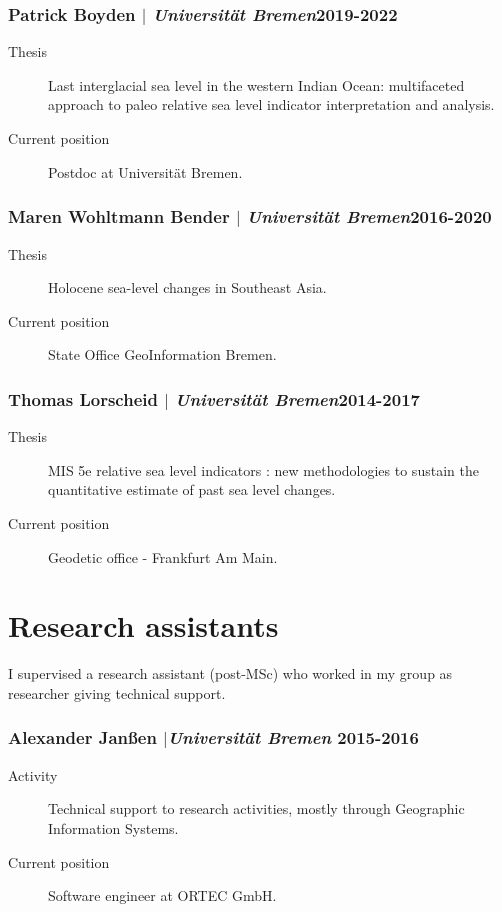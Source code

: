 \documentclass[11pt]{article}
\begin{document}
\subsubsection{Patrick Boyden $|$ {\normalfont\textit{Universität Bremen}}\hfill 2019-2022}
{\footnotesize 
\begin{description}
  \item [Thesis] Last interglacial sea level in the western Indian Ocean: multifaceted approach to paleo relative sea level indicator interpretation and analysis.
  \item [Current position] Postdoc at Universität Bremen. 
\end{description}
}
\smallskip

\subsubsection{Maren Wohltmann Bender $|$ {\normalfont\textit{Universität Bremen}}\hfill 2016-2020}
{\footnotesize 
\begin{description}
  \item [Thesis] Holocene sea-level changes in Southeast Asia.
  \item [Current position] State Office GeoInformation Bremen. 
\end{description}
}
\smallskip

\subsubsection{Thomas Lorscheid $|$ {\normalfont\textit{Universität Bremen}}\hfill 2014-2017}
{\footnotesize 
\begin{description}
  \item [Thesis] MIS 5e relative sea level indicators : new methodologies to sustain the quantitative estimate of past sea level changes.
  \item [Current position] Geodetic office - Frankfurt Am Main.
\end{description}
}

\section{Research assistants}
{\normalfont I supervised a research assistant (post-MSc) who worked in my group as researcher giving technical support.}\\

\subsubsection{Alexander Janßen $|${\normalfont\textit{Universität Bremen}} \hfill 2015-2016}
{\footnotesize 
\begin{description}
  \item [Activity] Technical support to research activities, mostly through Geographic Information Systems. 
  \item [Current position] Software engineer at ORTEC GmbH.

\end{description}
}
\end{document}
